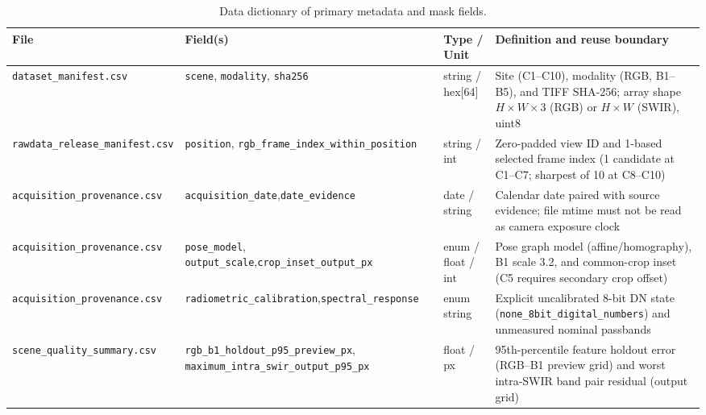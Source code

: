 \documentclass[a4paper,10pt]{article}
\begin{document}
\begin{table}[htbp]
\centering
\caption{Data dictionary of primary metadata and mask fields.}
\label{tab:data-dict-en}
\footnotesize\setlength{\tabcolsep}{4pt}
\begin{tabularx}{\textwidth}{@{}>{\raggedright\arraybackslash}p{}>{\raggedright\arraybackslash}p{}>{\raggedright\arraybackslash}p{}>{\raggedright\arraybackslash}X@{}}
\toprule
File & Field(s) & Type / Unit & Definition and reuse boundary\\
\midrule
\texttt{dataset\_manifest.csv} & \texttt{scene}, \texttt{modality}, \texttt{sha256} & string / hex[64] & Site (C1--C10), modality (RGB, B1--B5), and TIFF SHA-256; array shape $H\times W\times 3$ (RGB) or $H\times W$ (SWIR), uint8\\
\texttt{rawdata\_release\_\newline manifest.csv} & \texttt{position}, \texttt{rgb\_frame\_\newline index\_within\_position} & string / int & Zero-padded view ID and 1-based selected frame index (1 candidate at C1--C7; sharpest of 10 at C8--C10)\\
\texttt{acquisition\_\newline provenance.csv} & \texttt{acquisition\_date},\newline \texttt{date\_evidence} & date / string & Calendar date paired with source evidence; file mtime must not be read as camera exposure clock\\
\texttt{acquisition\_\newline provenance.csv} & \texttt{pose\_model}, \texttt{output\_scale},\newline \texttt{crop\_inset\_output\_px} & enum / float / int & Pose graph model (affine/homography), B1 scale 3.2, and common-crop inset (C5 requires secondary crop offset)\\
\texttt{acquisition\_\newline provenance.csv} & \texttt{radiometric\_calibration},\newline \texttt{spectral\_response} & enum string & Explicit uncalibrated 8-bit DN state (\texttt{none\_8bit\_digital\_numbers}) and unmeasured nominal passbands\\
\texttt{scene\_quality\_\newline summary.csv} & \texttt{rgb\_b1\_holdout\_p95\_\newline preview\_px}, \texttt{maximum\_intra\_\newline swir\_output\_p95\_px} & float / px & 95th-percentile feature holdout error (RGB--B1 preview grid) and worst intra-SWIR band pair residual (output grid)\\

\end{tabularx}
\end{table}
\end{document}
